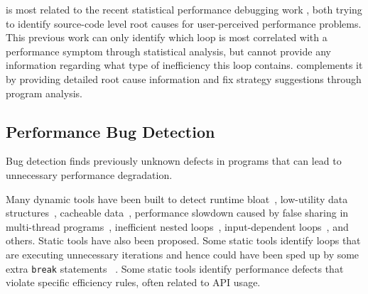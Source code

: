 \Tool is most related to
the recent statistical performance debugging work
\citep{SongOOPSLA2014}, both trying to identify source-code level root causes
for user-perceived performance problems. 
This previous work can only identify which loop is most correlated with 
a performance symptom through statistical analysis, 
but cannot provide any information
regarding what type of inefficiency this loop contains.
\Tool complements it by
providing detailed root cause information and fix strategy suggestions through
program analysis. 

\subsection{Performance Bug Detection}

Bug detection finds previously unknown defects in programs that can
lead to unnecessary performance degradation. 

Many dynamic tools have been built to detect
runtime bloat~\cite{Dufour:2008:STC:1453101.1453111, Xu:2009:GFP:1542476.1542523, Xu:2010:DIC:1806596.1806616}, 
low-utility data structures~\cite{Xu:2010:FLD:1806596.1806617}, 
cacheable data~\cite{Cachetor}, performance slowdown caused by false sharing in
multi-thread programs~\cite{Liu:2011:SPD:2048066.2048070},
inefficient nested loops~\cite{Alabama},
input-dependent loops~\cite{xiao13:context}, and others. 
Static tools have also been proposed. Some static tools identify loops 
that are executing 
unnecessary iterations and hence could have been sped up by some extra
\texttt{break} statements
~\cite{CARAMEL,IsilDillig.PLDI15}. 
Some static tools \cite{PerfBug} identify performance defects that violate
specific efficiency rules, often related to API usage. 

